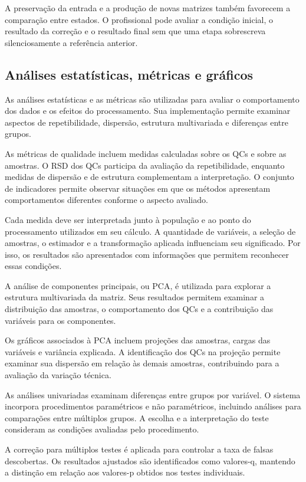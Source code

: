 A preservação da entrada e a produção de novas matrizes também favorecem a comparação entre estados. O profissional pode avaliar a condição inicial, o resultado da correção e o resultado final sem que uma etapa sobrescreva silenciosamente a referência anterior.

\subsection{Análises estatísticas, métricas e gráficos}
\label{subsec:analises-metricas-graficos}

As análises estatísticas e as métricas são utilizadas para avaliar o comportamento dos dados e os efeitos do processamento. Sua implementação permite examinar aspectos de repetibilidade, dispersão, estrutura multivariada e diferenças entre grupos.

As métricas de qualidade incluem medidas calculadas sobre os QCs e sobre as amostras. O RSD dos QCs participa da avaliação da repetibilidade, enquanto medidas de dispersão e de estrutura complementam a interpretação. O conjunto de indicadores permite observar situações em que os métodos apresentam comportamentos diferentes conforme o aspecto avaliado.

Cada medida deve ser interpretada junto à população e ao ponto do processamento utilizados em seu cálculo. A quantidade de variáveis, a seleção de amostras, o estimador e a transformação aplicada influenciam seu significado. Por isso, os resultados são apresentados com informações que permitem reconhecer essas condições.

A análise de componentes principais, ou PCA, é utilizada para explorar a estrutura multivariada da matriz. Seus resultados permitem examinar a distribuição das amostras, o comportamento dos QCs e a contribuição das variáveis para os componentes.

Os gráficos associados à PCA incluem projeções das amostras, cargas das variáveis e variância explicada. A identificação dos QCs na projeção permite examinar sua dispersão em relação às demais amostras, contribuindo para a avaliação da variação técnica.

As análises univariadas examinam diferenças entre grupos por variável. O sistema incorpora procedimentos paramétricos e não paramétricos, incluindo análises para comparações entre múltiplos grupos. A escolha e a interpretação do teste consideram as condições avaliadas pelo procedimento.

A correção para múltiplos testes é aplicada para controlar a taxa de falsas descobertas. Os resultados ajustados são identificados como valores-q, mantendo a distinção em relação aos valores-p obtidos nos testes individuais.

